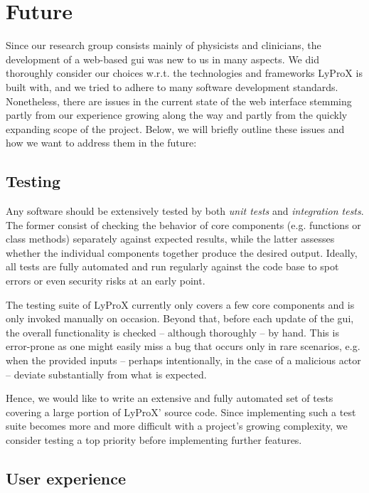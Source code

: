 \documentclass[\relativeRoot/main.tex]{subfiles}
\begin{document}
\section{Future}
\label{sec:lyprox:future}

Since our research group consists mainly of physicists and clinicians, the development of a web-based \gls{gui} was new to us in many aspects. We did thoroughly consider our choices w.r.t. the technologies and frameworks LyProX is built with, and we tried to adhere to many software development standards. Nonetheless, there are issues in the current state of the web interface stemming partly from our experience growing along the way and partly from the quickly expanding scope of the project. Below, we will briefly outline these issues and how we want to address them in the future:

\subsection*{Testing}

Any software should be extensively tested by both \emph{unit tests} and \emph{integration tests}. The former consist of checking the behavior of core components (e.g. functions or class methods) separately against expected results, while the latter assesses whether the individual components together produce the desired output. Ideally, all tests are fully automated and run regularly against the code base to spot errors or even security risks at an early point.

The testing suite of LyProX currently only covers a few core components and is only invoked manually on occasion. Beyond that, before each update of the \gls{gui}, the overall functionality is checked -- although thoroughly -- by hand. This is error-prone as one might easily miss a bug that occurs only in rare scenarios, e.g. when the provided inputs -- perhaps intentionally, in the case of a malicious actor -- deviate substantially from what is expected.

Hence, we would like to write an extensive and fully automated set of tests covering a large portion of LyProX' source code. Since implementing such a test suite becomes more and more difficult with a project's growing complexity, we consider testing a top priority before implementing further features.

\subsection*{User experience}
\end{document}
